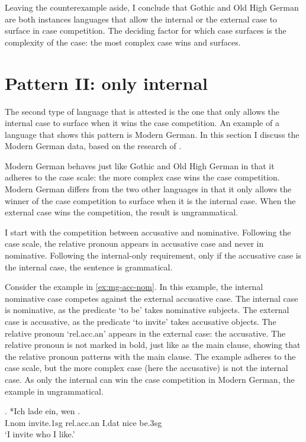 Leaving the counterexample aside, I conclude that Gothic and Old High German are both instances languages that allow the internal or the external case to surface in case competition. The deciding factor for which case surfaces is the complexity of the case: the most complex case wins and surfaces.


\section{Pattern II: only internal}\label{sec:pattern-ii}

The second type of language that is attested is the one that only allows the internal case to surface when it wins the case competition. An example of a language that shows this pattern is Modern German. In this section I discuss the Modern German data, based on the research of \citet{vogel2001}.

Modern German behaves just like Gothic and Old High German in that it adheres to the case scale: the more complex case wins the case competition. Modern German differs from the two other languages in that it only allows the winner of the case competition to surface when it is the internal case. When the external case wins the competition, the result is ungrammatical.

I start with the competition between accusative and nominative. Following the case scale, the relative pronoun appears in accusative case and never in nominative. Following the internal-only requirement, only if the accusative case is the internal case, the sentence is grammatical.

Consider the example in \ref{ex:mg-acc-nom}. In this example, the internal nominative case competes against the external accusative case.
The internal case is nominative, as the predicate  `to be' takes nominative subjects.
The external case is accusative, as the predicate  `to invite' takes accusative objects.
The relative pronoun  `\ac{rel}.\ac{acc}.\ac{an}' appears in the external case: the accusative. The relative pronoun is not marked in bold, just like as the main clause, showing that the relative pronoun patterns with the main clause.
The example adheres to the case scale, but the more complex case (here the accusative) is not the internal case. As only the internal can win the case competition in Modern German, the example in ungrammatical.

\exg. *Ich {lade ein}, wen   .\\
I.\ac{nom} invite.1\ac{sg}\scsub{[acc]} \ac{rel}.\ac{acc}.\ac{an} I.\ac{dat} nice be.3\ac{sg}\scsub{[nom]}\\
`I invite who I like.' \label{ex:mg-acc-nom}

